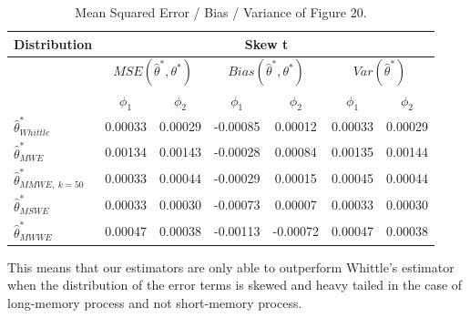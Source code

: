 \documentclass[
  11pt,
]{article}
\begin{document}
\begin{table}[h]
\centering
\begin{tabular}{|l|c|c|c|c|c|c|}
\hline
\multicolumn{1}{|c|}{\textbf{Distribution}} & \multicolumn{6}{c|}{\textbf{Skew t}}                                                                                                                             \\ \hline
\textbf{}                                   & \multicolumn{2}{c|}{$MSE(\hat \theta^*, \theta^*)$} & \multicolumn{2}{c|}{$Bias(\hat \theta^*, \theta^*)$} & \multicolumn{2}{c|}{$Var(\hat \theta^*)$} \\ \hline
                                            & $\phi_1$                 & $\phi_2$                 & $\phi_1$                  & $\phi_2$                 & $\phi_1$                 & $\phi_2$                 \\ \hline
$\hat \theta^*_{Whittle}$                   & 0.00033                  & 0.00029                  & -0.00085                  & 0.00012                  & 0.00033                  & 0.00029                  \\ \hline
$\hat \theta^*_{MWE}$                       & 0.00134                  & 0.00143                  & -0.00028                  & 0.00084                  & 0.00135                  & 0.00144                  \\ \hline
$\hat \theta^*_{MMWE, \ k = 50}$            & 0.00033                  & 0.00044                  & -0.00029                  & 0.00015                  & 0.00045                  & 0.00044                  \\ \hline
$\hat \theta^*_{MSWE}$                      & 0.00033                  & 0.00030                  & -0.00073                  & 0.00007                  & 0.00033                  & 0.00030                  \\ \hline
$\hat \theta^*_{MWWE}$                      & 0.00047                  & 0.00038                  & -0.00113                  & -0.00072                 & 0.00047                  & 0.00038                  \\ \hline
\end{tabular}
\caption{Mean Squared Error / Bias / Variance of Figure 20.}
\label{tab:ar2_skew_table}
\end{table}

This means that our
estimators are only able to outperform Whittle's estimator when the distribution of the error terms is skewed and heavy
tailed in the case of long-memory process and not short-memory
process.
\end{document}
